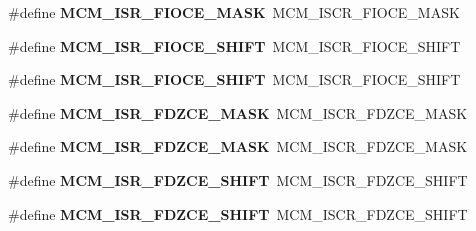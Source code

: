 \begin{DoxyCompactItemize}
\item 
\#define {\bfseries M\+C\+M\+\_\+\+I\+S\+R\+\_\+\+F\+I\+O\+C\+E\+\_\+\+M\+A\+SK}~M\+C\+M\+\_\+\+I\+S\+C\+R\+\_\+\+F\+I\+O\+C\+E\+\_\+\+M\+A\+SK\hypertarget{group__Backward__Compatibility__Symbols_ga8c2d933b91a6be29be3c45a9120d1a6d}{}\label{group__Backward__Compatibility__Symbols_ga8c2d933b91a6be29be3c45a9120d1a6d}

\item 
\#define {\bfseries M\+C\+M\+\_\+\+I\+S\+R\+\_\+\+F\+I\+O\+C\+E\+\_\+\+S\+H\+I\+FT}~M\+C\+M\+\_\+\+I\+S\+C\+R\+\_\+\+F\+I\+O\+C\+E\+\_\+\+S\+H\+I\+FT\hypertarget{group__Backward__Compatibility__Symbols_ga0d01a10f2c69f6ca26f2e7c8b94f2f2c}{}\label{group__Backward__Compatibility__Symbols_ga0d01a10f2c69f6ca26f2e7c8b94f2f2c}

\item 
\#define {\bfseries M\+C\+M\+\_\+\+I\+S\+R\+\_\+\+F\+I\+O\+C\+E\+\_\+\+S\+H\+I\+FT}~M\+C\+M\+\_\+\+I\+S\+C\+R\+\_\+\+F\+I\+O\+C\+E\+\_\+\+S\+H\+I\+FT\hypertarget{group__Backward__Compatibility__Symbols_ga0d01a10f2c69f6ca26f2e7c8b94f2f2c}{}\label{group__Backward__Compatibility__Symbols_ga0d01a10f2c69f6ca26f2e7c8b94f2f2c}

\item 
\#define {\bfseries M\+C\+M\+\_\+\+I\+S\+R\+\_\+\+F\+D\+Z\+C\+E\+\_\+\+M\+A\+SK}~M\+C\+M\+\_\+\+I\+S\+C\+R\+\_\+\+F\+D\+Z\+C\+E\+\_\+\+M\+A\+SK\hypertarget{group__Backward__Compatibility__Symbols_ga3bc1a6b47a2b34387b9a9a4dfe7d9e15}{}\label{group__Backward__Compatibility__Symbols_ga3bc1a6b47a2b34387b9a9a4dfe7d9e15}

\item 
\#define {\bfseries M\+C\+M\+\_\+\+I\+S\+R\+\_\+\+F\+D\+Z\+C\+E\+\_\+\+M\+A\+SK}~M\+C\+M\+\_\+\+I\+S\+C\+R\+\_\+\+F\+D\+Z\+C\+E\+\_\+\+M\+A\+SK\hypertarget{group__Backward__Compatibility__Symbols_ga3bc1a6b47a2b34387b9a9a4dfe7d9e15}{}\label{group__Backward__Compatibility__Symbols_ga3bc1a6b47a2b34387b9a9a4dfe7d9e15}

\item 
\#define {\bfseries M\+C\+M\+\_\+\+I\+S\+R\+\_\+\+F\+D\+Z\+C\+E\+\_\+\+S\+H\+I\+FT}~M\+C\+M\+\_\+\+I\+S\+C\+R\+\_\+\+F\+D\+Z\+C\+E\+\_\+\+S\+H\+I\+FT\hypertarget{group__Backward__Compatibility__Symbols_gaec1aefd34fd89aacc598bcdc6ebcd331}{}\label{group__Backward__Compatibility__Symbols_gaec1aefd34fd89aacc598bcdc6ebcd331}

\item 
\#define {\bfseries M\+C\+M\+\_\+\+I\+S\+R\+\_\+\+F\+D\+Z\+C\+E\+\_\+\+S\+H\+I\+FT}~M\+C\+M\+\_\+\+I\+S\+C\+R\+\_\+\+F\+D\+Z\+C\+E\+\_\+\+S\+H\+I\+FT\hypertarget{group__Backward__Compatibility__Symbols_gaec1aefd34fd89aacc598bcdc6ebcd331}{}\label{group__Backward__Compatibility__Symbols_gaec1aefd34fd89aacc598bcdc6ebcd331}


\end{DoxyCompactItemize}
